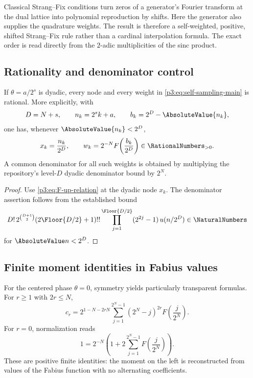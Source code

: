 \documentclass[11pt,oneside]{article}
\numberwithin{equation}{section}
\theoremstyle{definition}
\theoremstyle{remark}
\begin{document}
\begin{remark}
Classical Strang--Fix conditions turn zeros of a generator's Fourier transform at the dual lattice into polynomial reproduction by shifts.  Here the generator also supplies the quadrature weights.  The result is therefore a self-weighted, positive, shifted Strang--Fix rule rather than a cardinal interpolation formula.  The exact order is read directly from the $2$-adic multiplicities of the sinc product.
\end{remark}

\subsection{Rationality and denominator control}

\begin{corollary}
\label{p3:cor:rational-rules}
If $\theta=a/2^s$ is dyadic, every node and every weight in \eqref{p3:eq:self-sampling-main} is rational.  More explicitly, with
\[
 D=N+s,
 \qquad n_k=2^sk+a,
 \qquad b_k=2^D-\AbsoluteValue{n_k},
\]
one has, whenever $\AbsoluteValue{n_k}<2^D$,
\begin{equation}
 x_k=\frac{n_k}{2^D},
 \qquad
 w_k=2^{-N}F\!\left(\frac{b_k}{2^D}\right)\in\RationalNumbers_{>0}.
 \label{p3:eq:rational-weights}
\end{equation}
A common denominator for all such weights is obtained by multiplying the repository's level-$D$ dyadic denominator bound by $2^N$.
\end{corollary}

\begin{proof}
Use \eqref{p3:eq:F-up-relation} at the dyadic node $x_k$.  The denominator assertion follows from the established bound
\[
 D!\,2^{\binom{D+1}{2}}(2\Floor{D/2}+1)!!
 \prod_{j=1}^{\Floor{D/2}}(2^{2j}-1)\,u(n/2^D)\in\NaturalNumbers
\]
for $\AbsoluteValue n<2^D$.
\end{proof}

\subsection{Finite moment identities in Fabius values}

For the centered phase $\theta=0$, symmetry yields particularly transparent formulas.  For $r\ge1$ with $2r\le N$,
\begin{equation}
 \boxed{\displaystyle
 c_r=2^{1-N-2rN}
 \sum_{j=1}^{2^N-1}(2^N-j)^{2r}
 F\!\left(\frac j{2^N}\right).}
 \label{p3:eq:centered-moment-F}
\end{equation}
For $r=0$, normalization reads
\begin{equation}
 1=2^{-N}\left(1+2\sum_{j=1}^{2^N-1}F\!\left(\frac j{2^N}\right)\right).
 \label{p3:eq:centered-normalization-F}
\end{equation}
These are positive finite identities: the moment on the left is reconstructed from values of the Fabius function with no alternating coefficients.
\end{document}
